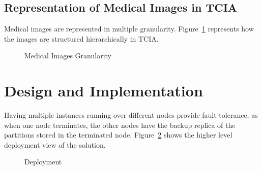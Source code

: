 \documentclass[conference]{IEEEtran}
\begin{document}
\subsection{Representation of Medical Images in TCIA}
Medical images are represented in multiple granularity. Figure~\ref{fig:granularity} represents how the images are structured hierarchically in TCIA.
\begin{figure}[!htbp]
\begin{center}
\end{center}
 \caption{Medical Images Granularity}
 \label{fig:granularity}
\end{figure}

\section{Design and Implementation}
\balance
Having multiple instances running over different nodes provide fault-tolerance, as when one node terminates, the other nodes have the backup replica of the partitions stored in the terminated node. Figure~\ref{fig:deployment} shows the higher level deployment view of the solution.
\begin{figure}[!htbp]
\begin{center}
\end{center}
 \caption{Deployment}
 \label{fig:deployment}
\end{figure}
\end{document}
